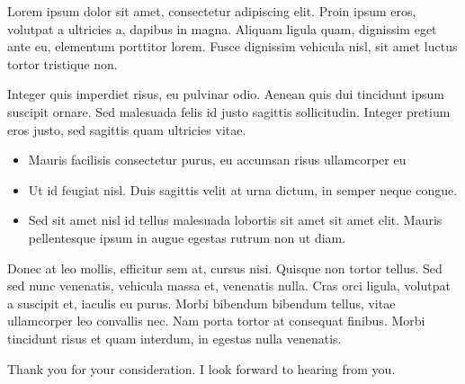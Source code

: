 Lorem ipsum dolor sit amet, consectetur adipiscing elit. Proin ipsum eros, volutpat a ultricies a, dapibus in magna. Aliquam ligula quam, dignissim eget ante eu, elementum porttitor lorem. Fusce dignissim vehicula nisl, sit amet luctus tortor tristique non.

Integer quis imperdiet risus, eu pulvinar odio. Aenean quis dui tincidunt ipsum suscipit ornare. Sed malesuada felis id justo sagittis sollicitudin. Integer pretium eros justo, sed sagittis quam ultricies vitae. 

\begin{itemize}
  \item Mauris facilisis consectetur purus, eu accumsan risus ullamcorper eu
  \item Ut id feugiat nisl. Duis sagittis velit at urna dictum, in semper neque congue.
  \item Sed sit amet nisl id tellus malesuada lobortis sit amet sit amet elit. Mauris pellentesque ipsum in augue egestas rutrum non ut diam.
\end{itemize}

Donec at leo mollis, efficitur sem at, cursus nisi. Quisque non tortor tellus. Sed sed nunc venenatis, vehicula massa et, venenatis nulla. Cras orci ligula, volutpat a suscipit et, iaculis eu purus. Morbi bibendum bibendum tellus, vitae ullamcorper leo convallis nec. Nam porta tortor at consequat finibus. Morbi tincidunt risus et quam interdum, in egestas nulla venenatis. 

Thank you for your consideration. I look forward to hearing from you.

